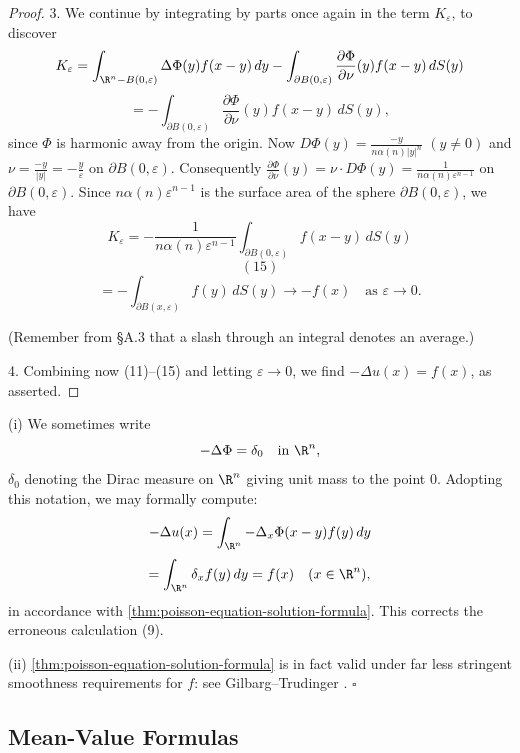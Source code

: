 \begin{proof}
3. We continue by integrating by parts once again in the term $K_\varepsilon$, to discover
$$K_\varepsilon = \int_{\R^n-B(0,\varepsilon)} \Delta\Phi(y)f(x-y)\,dy - \int_{\partial B(0,\varepsilon)} \frac{\partial \Phi}{\partial \nu}(y)f(x-y)\,dS(y)$$
$$= -\int_{\partial B(0,\varepsilon)} \frac{\partial \Phi}{\partial \nu}(y)f(x-y)\,dS(y),$$
since $\Phi$ is harmonic away from the origin. Now $D\Phi(y) = \frac{-y}{n\alpha(n)|y|^n}$ $(y \neq 0)$ and $\nu = \frac{-y}{|y|} = -\frac{y}{\varepsilon}$ on $\partial B(0, \varepsilon)$. Consequently $\frac{\partial \Phi}{\partial \nu}(y) = \nu \cdot D\Phi(y) = \frac{1}{n\alpha(n)\varepsilon^{n-1}}$ on $\partial B(0, \varepsilon)$. Since $n\alpha(n)\varepsilon^{n-1}$ is the surface area of the sphere $\partial B(0, \varepsilon)$, we have
$$K_\varepsilon = -\frac{1}{n\alpha(n)\varepsilon^{n-1}} \int_{\partial B(0,\varepsilon)} f(x-y) \, dS(y)$$
$$(15)$$
$$= -\int_{\partial B(x,\varepsilon)} f(y) \, dS(y) \to -f(x) \quad \text{as } \varepsilon \to 0.$$

(Remember from \S A.3 that a slash through an integral denotes an average.)

4. Combining now (11)--(15) and letting $\varepsilon \to 0$, we find $-\Delta u(x) = f(x)$, as asserted.
\end{proof}

\begin{remark}
\label{rem:poisson-equation-dirac-delta-notation}
(i) We sometimes write
$$-\Delta \Phi = \delta_0 \quad \text{in } \R^n,$$
$\delta_0$ denoting the Dirac measure on $\R^n$ giving unit mass to the point $0$. Adopting this notation, we may formally compute:
$$-\Delta u(x) = \int_{\R^n} -\Delta_x \Phi(x-y) f(y) \, dy$$
$$= \int_{\R^n} \delta_x f(y) \, dy = f(x) \quad (x \in \R^n),$$
in accordance with \cref{thm:poisson-equation-solution-formula}. This corrects the erroneous calculation (9).

(ii) \cref{thm:poisson-equation-solution-formula} is in fact valid under far less stringent smoothness requirements for $f$: see Gilbarg--Trudinger \cite{GilbargTrudinger1983}. $\square$
\end{remark}

\subsection{Mean-Value Formulas}
\label{sec:laplace-mean-value-formulas}

